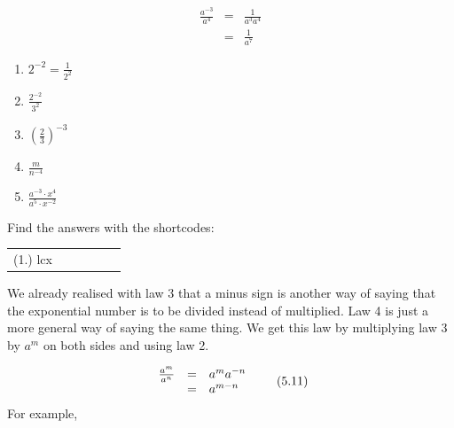     \begin{equation}
    \begin{array}{ccc}\frac{{a}^{-3}}{{a}^{4}}& =& \frac{1}{{a}^{3}{a}^{4}}\\ & =& \frac{1}{{a}^{7}}\end{array}\tag{5.10}
      \end{equation}
\par \label{m38359*secfhsst!!!underscore!!!id835}
            \nopagebreak
        \label{m38359*id64771}\begin{enumerate}[noitemsep, label=\textbf{\arabic*}. ] 
            \label{m38359*uid18}\item 
            ${2}^{-2}=\frac{1}{{2}^{2}}$
      \label{m38359*uid19}\item 
        $\frac{{2}^{-2}}{{3}^{2}}$
      \label{m38359*uid20}\item 
        ${\left(\frac{2}{3}\right)}^{-3}$
      \label{m38359*uid21}\item 
        $\frac{m}{{n}^{-4}}$
      \label{m38359*uid22}\item 
        $\frac{{a}^{-3}\ensuremath{\cdot}{x}^{4}}{{a}^{5}\ensuremath{\cdot}{x}^{-2}}$
\newline
\newline
          \end{enumerate}
      \label{m38359*uid23}
\par {} Find the answers with the shortcodes:
 \par \begin{tabular}[h]{cccccc}
 (1.) lcx  & \end{tabular}
            \nopagebreak
        \label{m38359*id65186}We already realised with law 3 that a minus sign is another way of saying that the exponential number is to be divided instead of multiplied. Law 4 is just a more general way of saying the same thing. We get this law by multiplying law 3 by ${a}^{m}$ on both sides and using law 2.\par 
        \label{m38359*uid24}\nopagebreak\noindent{}
          
    \begin{equation}
    \begin{array}{ccc}\hfill \frac{{a}^{m}}{{a}^{n}}& =& {a}^{m}{a}^{-n}\hfill \\ \hfill & =& {a}^{m-n}\hfill \end{array}\tag{5.11}
      \end{equation}
        \label{m38359*id65293}For example,\par 
        \label{m38359*id65296}\nopagebreak\noindent{}
          
